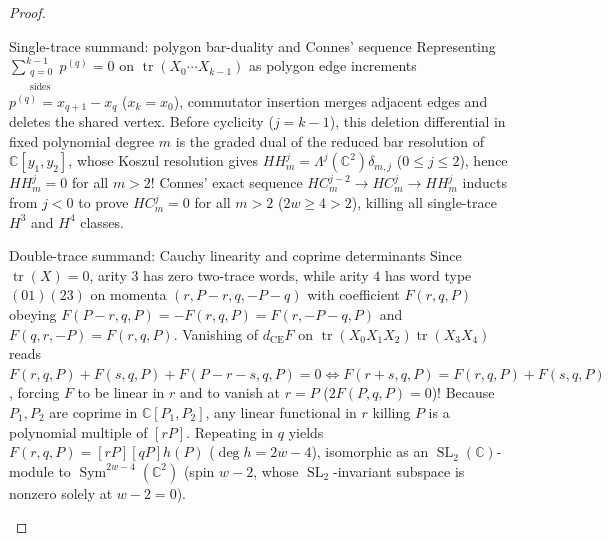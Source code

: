 \documentclass[11pt,letterpaper]{article}
\numberwithin{equation}{section}
\theoremstyle{plain}
\theoremstyle{definition}
\theoremstyle{remark}
\newcommand{\tr}{\operatorname{tr}}
\newcommand{\Sym}{\operatorname{Sym}}
\newcommand{\SL}{\operatorname{SL}}
\begin{document}
\begin{proof}\leavevmode\par\vspace{2pt}
\begin{proofpart}{Single-trace summand: polygon bar-duality and Connes' sequence}
Representing $\sum_{\substack{q=0\\\mathrm{sides}}}^{k-1} p^{(q)} = 0$ on $\tr(X_0\cdots X_{k-1})$ as polygon edge increments $p^{(q)} = x_{q+1} - x_q$ ($x_k = x_0$), commutator insertion merges adjacent edges and deletes the shared vertex. Before cyclicity ($j = k - 1$), this deletion differential in fixed polynomial degree $m$ is the graded dual of the reduced bar resolution of $\mathbb{C}[y_1,y_2]$, whose Koszul resolution gives $HH^j_m = \Lambda^j(\mathbb{C}^2)\delta_{m,j}$ ($0 \le j \le 2$), hence $HH^j_m = 0$ for all $m > 2$! Connes' exact sequence $HC^{j-2}_m \to HC^j_m \to HH^j_m$ inducts from $j < 0$ to prove $HC^j_m = 0$ for all $m > 2$ ($2w \ge 4 > 2$), killing all single-trace $H^3$ and $H^4$ classes.
\end{proofpart}
\begin{proofpart}{Double-trace summand: Cauchy linearity and coprime determinants}
Since $\tr(X)=0$, arity $3$ has zero two-trace words, while arity $4$ has word type $(01)(23)$ on momenta $(r, P-r, q, -P-q)$ with coefficient $F(r,q,P)$ obeying $F(P-r,q,P) = -F(r,q,P) = F(r,-P-q,P)$ and $F(q,r,-P) = F(r,q,P)$. Vanishing of $d_{\mathrm{CE}}F$ on $\tr(X_0 X_1 X_2)\tr(X_3 X_4)$ reads $F(r,q,P) + F(s,q,P) + F(P-r-s,q,P) = 0 \Longleftrightarrow F(r+s,q,P) = F(r,q,P) + F(s,q,P)$, forcing $F$ to be linear in $r$ and to vanish at $r = P$ ($2F(P,q,P) = 0$)! Because $P_1, P_2$ are coprime in $\mathbb{C}[P_1,P_2]$, any linear functional in $r$ killing $P$ is a polynomial multiple of $[rP]$. Repeating in $q$ yields $F(r,q,P) = [rP][qP]h(P)$ ($\deg h = 2w - 4$), isomorphic as an $\SL_2(\mathbb{C})$-module to $\Sym^{2w-4}(\mathbb{C}^2)$ (spin $w - 2$, whose $\SL_2$-invariant subspace is nonzero solely at $w - 2 = 0$).\qedhere
\end{proofpart}
\end{proof}
\end{document}
